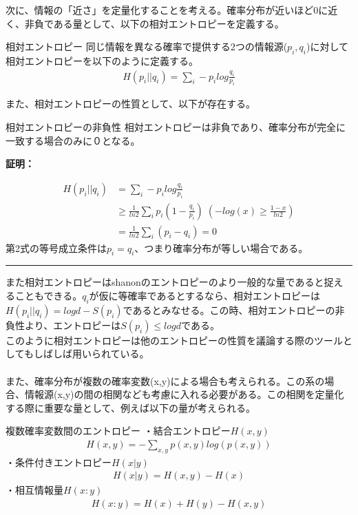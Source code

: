 \documentclass[a4paper,10.5pt]{article}
\numberwithin{equation}{section}
\newenvironment{proofbox}
{\begin{prooflabel}\textbf{証明：}\end{prooflabel}\vspace{0.8em}}
{\par\vspace{1em}\hrule\vspace{1em}}
\begin{document}
 次に、情報の「近さ」を定量化することを考える。確率分布が近いほど0に近く、非負である量として、以下の相対エントロピーを定義する。
\begin{defbox}{相対エントロピー}
同じ情報を異なる確率で提供する2つの情報源($p_{i},q_{i}$)に対して相対エントロピーを以下のように定義する。
\begin{equation}\begin{split}
    H(p_{i}||q_{i}) = \sum_{i}-p_{i}log\frac{q_{i}}{p_{i}}
\end{split} \end{equation}
\end{defbox}
また、相対エントロピーの性質として、以下が存在する。
\begin{resultbox}{相対エントロピーの非負性}
 相対エントロピーは非負であり、確率分布が完全に一致する場合のみに０となる。
\end{resultbox}
\begin{proofbox}
 \begin{equation}\begin{split}
     H(p_{i}||q_{i}) &= \sum_{i}-p_{i}log\frac{q_{i}}{p_{i}}\\
     &\geq \frac{1}{ln2}\sum_{i}p_{i}(1-\frac{q_{i}}{p_{i}})\;(-log(x)\geq \frac{1-x}{ln2})\\
     &=\frac{1}{ln2}\sum_{i}(p_{i}-q_{i}) =0
 \end{split} \end{equation}
 第2式の等号成立条件は$p_{i}=q_{i}$、つまり確率分布が等しい場合である。
\end{proofbox}
また相対エントロピーはshanonのエントロピーのより一般的な量であると捉えることもできる。$q_{i}$が仮に等確率であるとするなら、相対エントロピーは$H(p_{i}||q_{i})=logd-S(p_{i})$であるとみなせる。この時、相対エントロピーの非負性より、エントロピーは$S(p_{i})\leq logd$である。\\
このように相対エントロピーは他のエントロピーの性質を議論する際のツールとしてもしばしば用いられている。\\
\\
また、確率分布が複数の確率変数(x,y)による場合も考えられる。この系の場合、情報源(x,y)の間の相関なども考慮に入れる必要がある。この相関を定量化する際に重要な量として、例えば以下の量が考えられる。
\begin{defbox}{複数確率変数間のエントロピー}
 ・結合エントロピー$H(x,y)$
 \begin{equation}\begin{split}
     H(x,y) = -\sum_{x,y}p(x,y)log(p(x,y))
\end{split} \end{equation}
・条件付きエントロピー$H(x|y)$
\begin{equation}\begin{split}
    H(x|y)=H(x,y) - H(x)
\end{split} \end{equation}
・相互情報量$H(x:y)$
\begin{equation}\begin{split}
    H(x:y) = H(x)+H(y)-H(x,y)
\end{split} \end{equation}
\end{defbox}
\end{document}
